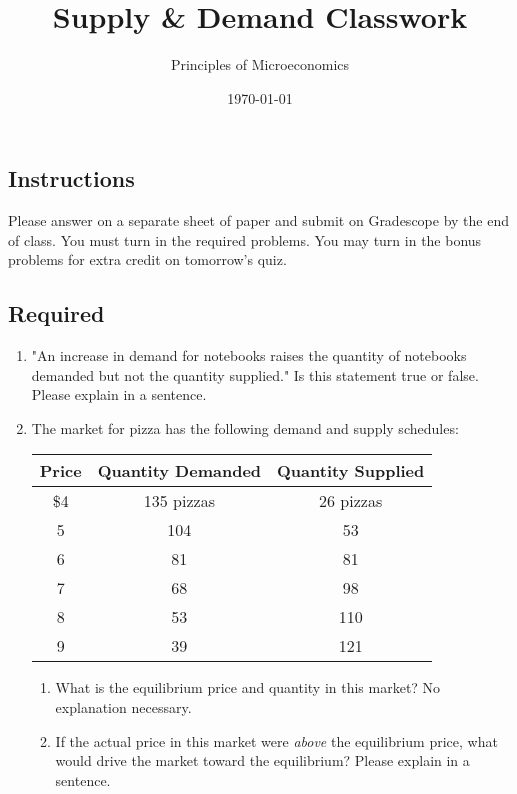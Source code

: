 \documentclass{article}
\title{Supply \& Demand Classwork}
\author{Principles of Microeconomics}
\date{\today}
\begin{document}
\maketitle

\subsection*{Instructions} Please answer on a separate sheet of paper and submit on Gradescope by the end of class. You must turn in the required problems. You may turn in the bonus problems for extra credit on tomorrow's quiz.

\subsection*{Required}

\begin{enumerate}

\item "An increase in demand for notebooks raises the quantity of notebooks demanded but not the quantity supplied." Is this statement true or false. Please explain in a sentence.

\item The market for pizza has the following demand and supply schedules:

	\begin{center}
	\begin{tabular}{c c c}
	\textbf{Price} & \textbf{Quantity Demanded} & \textbf{Quantity Supplied} \\
	\hline
	\$4 & 135 pizzas & 26 pizzas \\
	5 & 104 & 53 \\
	6 & 81 & 81 \\
	7 & 68 & 98 \\
	8 & 53 & 110 \\
	9 & 39 & 121
	\end{tabular}
	\end{center}

	\begin{enumerate}
	
	\item What is the equilibrium price and quantity in this market? No explanation necessary. 
	
	\item If the actual price in this market were \textit{above} the equilibrium price, what would drive the market toward the equilibrium? Please explain in a sentence.
	

\end{enumerate}
\end{enumerate}
\end{document}
